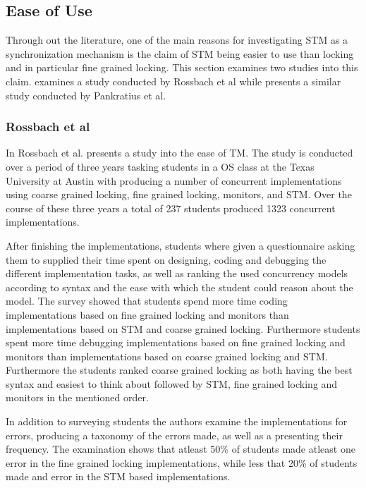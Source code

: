 \subsection{Ease of Use}
\label{sec:stm_ease_of_use}
Through out the literature, one of the main reasons for investigating \ac{STM} as a synchronization mechanism is the claim of \ac{STM} being easier to use than locking and in particular fine grained locking. This section examines two studies into this claim.  examines a study conducted by Rossbach et al while  presents a similar study conducted by Pankratius et al.
\subsubsection{Rossbach et al}
\label{sec:stm_ease_rossbach}
In \cite{rossbach2010transactional} Rossbach et al. presents a study into the ease of \ac{TM}. The study is conducted over a period of three years tasking students in a \ac{OS} class at the Texas University at Austin with producing a number of concurrent implementations using coarse grained locking, fine grained locking, monitors, and \ac{STM}. Over the course of these three years a total of 237 students produced 1323 concurrent implementations. 

After finishing the implementations, students where given a questionnaire asking them to supplied their time spent on designing, coding and debugging the different implementation tasks, as well as ranking the used concurrency models according to syntax and the ease with which the student could reason about the model. The survey showed that students spend more time coding implementations based on fine grained locking and monitors than implementations based on \ac{STM} and coarse grained locking\cite[p. 51]{rossbach2010transactional}. Furthermore students spent more time debugging implementations based on fine grained locking and monitors than implementations based on coarse grained locking and \ac{STM}\cite[p. 51]{rossbach2010transactional}. Furthermore the students ranked coarse grained locking as both having the best syntax and easiest to think about followed by \ac{STM}, fine grained locking and monitors in the mentioned order.

In addition to surveying students the authors examine the implementations for errors, producing a taxonomy of the errors made, as well as a presenting their frequency. The examination shows that atleast 50\% of students made atleast one error in the fine grained locking implementations, while less that 20\% of students made and error in the \ac{STM} based implementations. 


